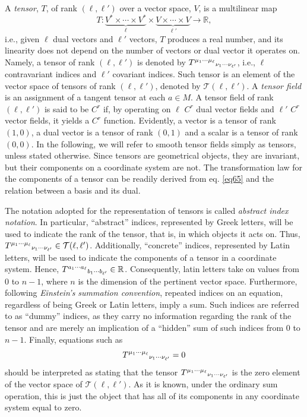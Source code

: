 \documentclass[
12pt,		%
openright,	%
twoside,  %
a4paper,			%
chapter=TITLE,		%
english,			%
french,				%
spanish,			%
brazil				%
]{USPSC-classe/USPSC}
\begin{document}
\begin{apendicesenv}
A \textit{tensor}, $T$, of rank $(\ell,\ell')$ over a vector space, $V$, is a multilinear map 
\begin{equation}
    T:\underbrace{V^*\times\cdots\times V^*}_{\ell}\times \underbrace{V\times\cdots\times V}_{\ell'}\to\mathbb{R},
\end{equation}
i.e., given $\ell$ dual vectors and $\ell'$ vectors, $T$ produces a real number, and its linearity does not depend on the number of vectors or dual vector it operates on. Namely, a tensor of rank $(\ell,\ell')$ is denoted by $T^{\mu_1\cdots\mu_{\ell}}\mathstrut_{\nu_1\cdots\nu_{\ell'}}$, i.e., $\ell$ contravariant indices and $\ell'$ covariant indices. Such tensor is an element of the vector space of tensors of rank $(\ell,\ell')$, denoted by $\mathcal{T}(\ell,\ell')$. A \textit{tensor field} is an assignment of a tangent tensor at each $a\in M$. A tensor field of rank $(\ell,\ell')$ is said to be $C^r$ if, by operating on $\ell$ $C^r$ dual vector fields and $\ell'$ $C^r$ vector fields, it yields a $C^r$ function. Evidently, a vector is a tensor of rank $(1,0)$, a dual vector is a tensor of rank $(0,1)$ and a scalar is a tensor of rank $(0,0)$. In the following, we will refer to smooth tensor fields simply as tensors, unless stated otherwise. Since tensors are geometrical objects, they are invariant, but their components on a coordinate system are not. The transformation law for the components of a tensor can be readily derived from eq. \ref{eq65} and the relation between a basis and its dual.

The notation adopted for the representation of tensors is called \textit{abstract index notation}. In particular, “abstract” indices, represented by Greek letters, will be used to indicate the rank of the tensor, that is, in which objects it acts on. Thus, $T^{\mu_1\cdots\mu_{\ell}}\mathstrut_{\nu_1\cdots\nu_{\ell'}}\in\mathcal{T}(\ell,\ell')$. Additionally, “concrete” indices, represented by Latin letters, will be used to indicate the components of a tensor in a coordinate system. Hence, $T^{a_1\cdots a_{\ell}}\mathstrut_{b_1\cdots b_{\ell'}}\in\mathbb{R}$. Consequently, latin letters take on values from $0$ to $n-1$, where $n$ is the dimension of the pertinent vector space. Furthermore, following \textit{Einstein's summation convention}, repeated indices on an equation, regardless of being Greek or Latin letters, imply a sum. Such indices are referred to as “dummy” indices, as they carry no information regarding the rank of the tensor and are merely an implication of a “hidden” sum of such indices from $0$ to $n-1$. Finally, equations such as
\begin{equation}
    T^{\mu_1\cdots\mu_{\ell}}\mathstrut_{\nu_1\cdots\nu_{\ell'}}=0
\end{equation}
should be interpreted as stating that the tensor $T^{\mu_1\cdots\mu_{\ell}}\mathstrut_{\nu_1\cdots\nu_{\ell'}}$ is the zero element of the vector space of $\mathcal{T}(\ell,\ell')$. As it is known, under the ordinary sum operation, this is just the object that has all of its components in any coordinate system equal to zero.


\end{apendicesenv}
\end{document}
